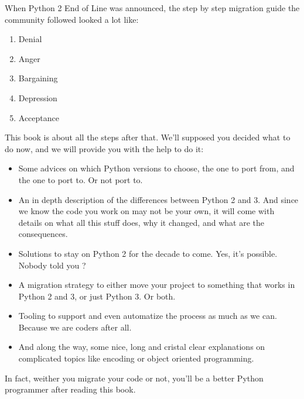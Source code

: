 
When Python 2 End of Line was announced, the step by step migration guide the community followed looked a lot like:

\begin{enumerate}
\item Denial
\item Anger
\item Bargaining
\item Depression
\item Acceptance
\end{enumerate}

This book is about all the steps after that. We'll supposed you decided what to do now, and we will provide you with the help to do it:

\begin{itemize}
\item Some advices on which Python versions to choose, the one to port from, and the one to port to. Or not port to.

\item An in depth description of the differences between Python 2 and 3. And since we know the code you work on may not be your own, it will come with details on what all this stuff does, why it changed, and what are the consequences.

\item Solutions to stay on Python 2 for the decade to come. Yes, it's possible. Nobody told you ?

\item A migration strategy to either  move your project to something that works in Python 2 and 3, or just Python 3. Or both.

\item Tooling to support and even automatize the process as much as we can. Because we are coders after all.

\item And along the way, some nice, long and cristal clear explanations on complicated topics like encoding or object oriented programming.
\end{itemize}

In fact, weither you migrate your code or not, you'll be a better Python programmer after reading this book.
